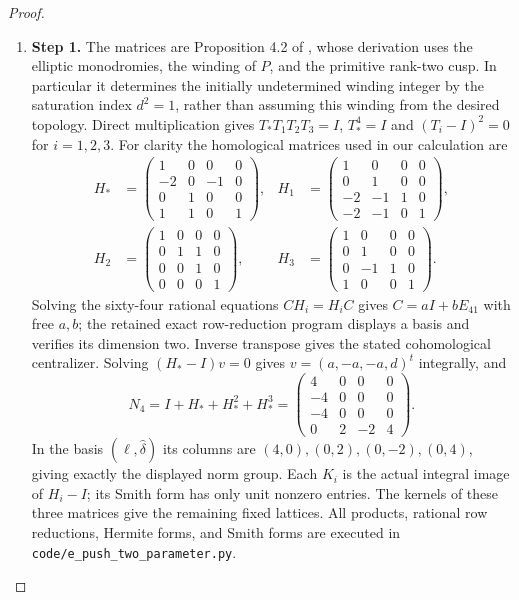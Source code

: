 \begin{proof}
\begin{enumerate}[label={$\langle1\rangle$\arabic*.},leftmargin=*]
\item 
\noindent\textbf{Step 1.} The matrices are Proposition 4.2 of \cite{ViaTwo26push}, whose
derivation uses the elliptic monodromies, the winding of $P$,
and the primitive rank-two cusp.  In particular it determines
the initially undetermined winding integer by the saturation
index $d^2=1$, rather than assuming this winding from the
desired topology.  Direct multiplication gives
$T_*T_1T_2T_3=I$, $T_*^4=I$ and
$(T_i-I)^2=0$ for $i=1,2,3$.
For clarity the homological matrices used in our calculation are
\[
\begin{aligned}
 H_*&=\begin{pmatrix}1&0&0&0\\-2&0&-1&0\\0&1&0&0\\1&1&0&1\end{pmatrix},&
 H_1&=\begin{pmatrix}1&0&0&0\\0&1&0&0\\-2&-1&1&0\\-2&-1&0&1\end{pmatrix},\\
 H_2&=\begin{pmatrix}1&0&0&0\\0&1&1&0\\0&0&1&0\\0&0&0&1\end{pmatrix},&
 H_3&=\begin{pmatrix}1&0&0&0\\0&1&0&0\\0&-1&1&0\\1&0&0&1\end{pmatrix}.
\end{aligned}
\]
Solving the sixty-four rational equations $CH_i=H_iC$
gives $C=aI+bE_{41}$ with free $a,b$; the retained exact
row-reduction program displays a basis and verifies its
dimension two.  Inverse transpose gives the stated
cohomological centralizer.  Solving $(H_*-I)v=0$ gives
$v=(a,-a,-a,d)^t$ integrally, and
\[
 N_4=I+H_*+H_*^2+H_*^3
 =\begin{pmatrix}4&0&0&0\\-4&0&0&0\\-4&0&0&0\\0&2&-2&4\end{pmatrix}.
\]
In the basis $(\ell,\widehat\delta)$ its columns are
$(4,0),(0,2),(0,-2),(0,4)$, giving exactly the displayed
norm group.  Each $K_i$ is the actual integral image of
$H_i-I$; its Smith form has only unit nonzero entries.
The kernels of these three matrices give the remaining fixed
lattices.  All products, rational row reductions, Hermite forms,
and Smith forms are executed in
\texttt{code/e\_push\_two\_parameter.py}.

\end{enumerate}
\end{proof}

